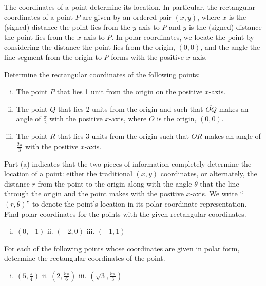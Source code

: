 \begin{pa} \label{PA:11.5}  The coordinates of a point determine its location. In particular, the rectangular coordinates of a point $P$ are given by an ordered pair $(x,y)$, where $x$ is the (signed) distance the point lies from the $y$-axis to $P$ and $y$ is the (signed) distance the point lies from the $x$-axis to $P$.  In polar coordinates, we locate the point by considering the distance the point lies from the origin, $(0,0)$, and the angle the line segment from the origin to $P$ forms with the positive $x$-axis.
    \ba
    \item Determine the rectangular coordinates of the following points:
        \begin{enumerate}[i.]
        \item The point $P$ that lies 1 unit from the origin on the positive $x$-axis.


        \item The point $Q$ that lies 2 units from the origin and such that $\overline{OQ}$ makes an angle of $\frac{\pi}{2}$ with the positive $x$-axis, where $O$ is the origin, $(0,0)$.


        \item The point $R$ that lies 3 units from the origin such that $\overline{OR}$ makes an angle of $\frac{2\pi}{3}$ with the positive $x$-axis.

        \end{enumerate}

    \item Part (a) indicates that the two pieces of information completely determine the location of a point:  either the traditional $(x,y)$ coordinates, or alternately, the distance $r$ from the point to the origin along with the angle $\theta$ that the line through the origin and the point makes with the positive $x$-axis. We write ``$(r, \theta)$'' to denote the point's location in its polar coordinate representation. Find polar coordinates for the points with the given rectangular coordinates.
        \begin{enumerate}[i.]
        \item $(0,-1)$  \hspace{1.0in} ii.  $(-2,0)$  \hspace{1.0in} iii.  $(-1,1)$

        \end{enumerate}

	\item For each of the following points whose coordinates are given in polar form, determine the rectangular coordinates of the point.
       \begin{enumerate}[i.]
          \item $(5, \frac{\pi}{4})$         \hspace{1.0in} ii. $(2, \frac{5\pi}{6})$   \hspace{1.0in} iii. $(\sqrt{3}, \frac{5\pi}{3})$
       \end{enumerate}

    \ea

\end{pa} 

